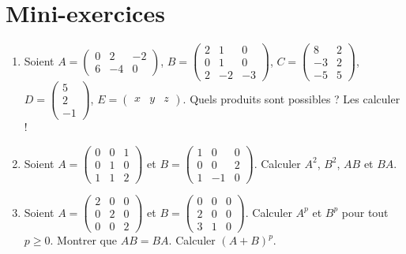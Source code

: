 \section{Mini-exercices}

\begin{frame}

\begin{miniexercice}
\begin{enumerate}
  \item Soient 
  $A=\left(\begin{smallmatrix}0&2&-2\\6&-4&0\end{smallmatrix} \right)$,
  $B=\left(\begin{smallmatrix}2&1&0\\0&1&0\\2&-2&-3\end{smallmatrix} \right)$,
  $C=\left(\begin{smallmatrix}8&2\\-3&2\\-5&5\end{smallmatrix} \right)$,
  $D=\left(\begin{smallmatrix}5\\2\\-1\end{smallmatrix} \right)$,
  $E=\left(\begin{matrix}x&y&z\end{matrix} \right)$.
  Quels produits sont possibles ? Les calculer !
  
  \item Soient $A= \left(\begin{smallmatrix}0&0&1\\0&1&0\\1&1&2 \end{smallmatrix} \right)$
  et $B=\left(\begin{smallmatrix}1&0&0\\0&0&2\\1&-1&0\end{smallmatrix} \right)$.
  Calculer $A^2$, $B^2$, $AB$ et $BA$.
  
  \item Soient $A= \left(\begin{smallmatrix} 2&0&0\\0&2&0\\0&0&2\end{smallmatrix} \right)$
  et $B=\left(\begin{smallmatrix}0&0&0\\2&0&0\\3&1&0\end{smallmatrix} \right)$.
  Calculer $A^p$ et $B^p$ pour tout $p\ge0$. Montrer que $AB=BA$. Calculer $(A+B)^p$.

\end{enumerate}
\end{miniexercice}

\end{frame}

